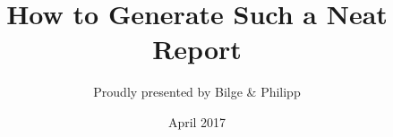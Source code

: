 \documentclass[bibliography=totocnumbered]{scrreprt}
\begin{document}
\title{How to Generate Such a Neat Report}
\author{Proudly presented by Bilge \& Philipp}
\date{April 2017}
\maketitle

\tableofcontents 











\begin{comment}
\end{comment}
\end{document}
